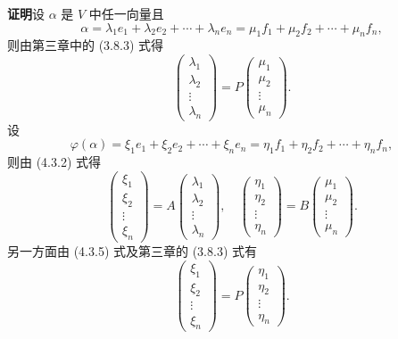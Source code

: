 \documentclass[UTF8, 12pt, fontset=fandol, oneside]{ctexart}
\begin{document}
\noindent\textbf{证明}\quad 设 $\alpha$ 是 $V$ 中任一向量且
\[
\alpha=\lambda_1e_1+\lambda_2e_2+\cdots+\lambda_ne_n=\mu_1f_1+\mu_2f_2+\cdots+\mu_nf_n,
\]
则由第三章中的 (3.8.3) 式得
\begin{equation}
\left(\begin{array}{c}
\lambda_1\\
\lambda_2\\
\vdots\\
\lambda_n
\end{array}\right)
=P
\left(\begin{array}{c}
\mu_1\\
\mu_2\\
\vdots\\
\mu_n
\end{array}\right).
\tag{4.3.4}
\end{equation}
设
\begin{equation}
\varphi(\alpha)=\xi_1e_1+\xi_2e_2+\cdots+\xi_ne_n=\eta_1f_1+\eta_2f_2+\cdots+\eta_nf_n,
\tag{4.3.5}
\end{equation}
则由 (4.3.2) 式得
\begin{equation}
\left(\begin{array}{c}
\xi_1\\
\xi_2\\
\vdots\\
\xi_n
\end{array}\right)
=A
\left(\begin{array}{c}
\lambda_1\\
\lambda_2\\
\vdots\\
\lambda_n
\end{array}\right),\quad
\left(\begin{array}{c}
\eta_1\\
\eta_2\\
\vdots\\
\eta_n
\end{array}\right)
=B
\left(\begin{array}{c}
\mu_1\\
\mu_2\\
\vdots\\
\mu_n
\end{array}\right).
\tag{4.3.6}
\end{equation}
另一方面由 (4.3.5) 式及第三章的 (3.8.3) 式有
\begin{equation}
\left(\begin{array}{c}
\xi_1\\
\xi_2\\
\vdots\\
\xi_n
\end{array}\right)
=P
\left(\begin{array}{c}
\eta_1\\
\eta_2\\
\vdots\\
\eta_n
\end{array}\right).
\tag{4.3.7}
\end{equation}
\end{document}
